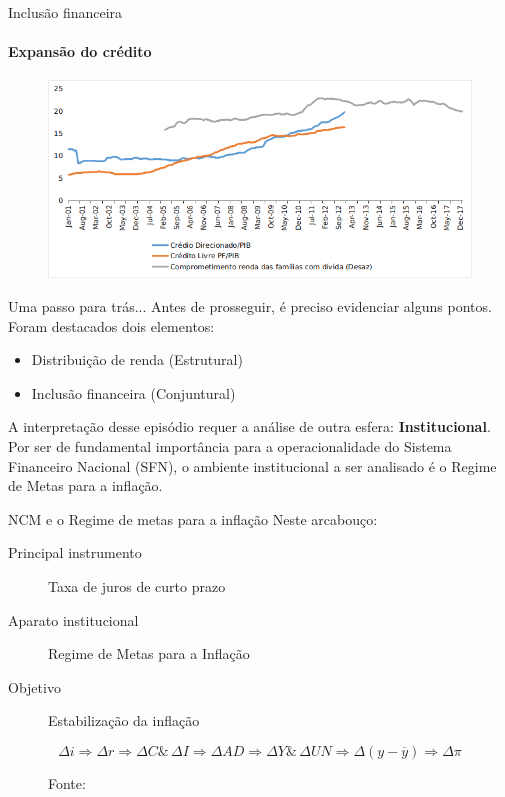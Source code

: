 \documentclass[pdf, xcolor=table]{beamer}
\begin{document}
\begin{frame}{Inclusão financeira}
\framesubtitle{Expansão do crédito}
\begin{figure}
	\centering
	\includegraphics[width=1.2\textheight]{Credito.png}
\end{figure}
\end{frame}


\begin{frame}{Uma passo para trás...}
    Antes de prosseguir, é preciso evidenciar alguns pontos. Foram destacados dois elementos:
    \begin{itemize}
        \item Distribuição de renda (Estrutural)
        \item Inclusão financeira (Conjuntural)
    \end{itemize}
    A interpretação desse episódio requer a análise de outra esfera: \textbf{Institu\-cional}. Por ser de fundamental importância para a operacionalidade do Sistema Financeiro Nacional (SFN), o ambiente institucional a ser analisado é o Regime de Metas para a inflação.
\end{frame}

\begin{frame}{NCM e o Regime de metas para a inflação}
	Neste arcabouço:
	\begin{description}
		\item[Principal instrumento] Taxa de juros de curto prazo
		\item[Aparato institucional] Regime de Metas para a Inflação
		\item[Objetivo] Estabilização da inflação
	\end{description}
\begin{framed}



\begin{figure}[H]
	\centering
	\caption{Canal de transmissão}
	\label{ADFont}
	\vspace{-1cm}
	\[\Delta i \Rightarrow \Delta r \Rightarrow \Delta C \& \, \Delta I \Rightarrow \Delta AD \Rightarrow \Delta Y \& \, \Delta UN \Rightarrow \Delta (y - \overline{y}) \Rightarrow \Delta \pi\]
	\caption*{Fonte: \textcite[ p.~10]{Fontana}}
\end{figure}
\end{framed}
\end{frame}
\end{document}
